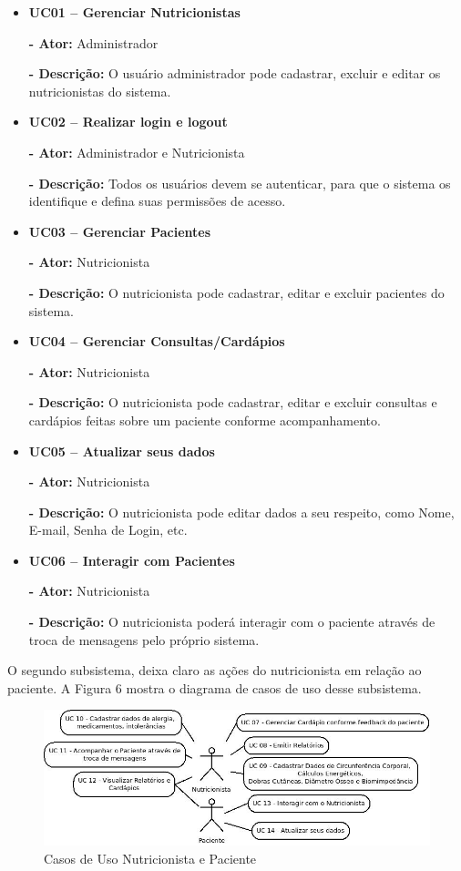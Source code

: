 \documentclass[
	12pt,				%
    oneside,			%
	a4paper,			%
	english,			%
	french,				%
	spanish,			%
	brazil,				%
	]{abntex2}
\begin{document}
\begin{itemize}
\item \textbf{UC01 – Gerenciar Nutricionistas}

\textbf{- Ator:} Administrador

\textbf{- Descrição:} O usuário administrador pode cadastrar, excluir e
editar os nutricionistas do sistema.

\item \textbf{UC02 – Realizar login e logout}

\textbf{- Ator:} Administrador e Nutricionista

\textbf{- Descrição:} Todos os usuários devem se autenticar, para que o
sistema os identifique e defina suas permissões de acesso.

\item \textbf{UC03 – Gerenciar Pacientes}

\textbf{- Ator:} Nutricionista

\textbf{- Descrição:} O nutricionista pode cadastrar, editar e excluir
pacientes do sistema.

\item \textbf{UC04 – Gerenciar Consultas/Cardápios}

\textbf{- Ator:} Nutricionista

\textbf{- Descrição:} O nutricionista pode cadastrar, editar e excluir
consultas e cardápios feitas sobre um paciente conforme acompanhamento.

\item \textbf{UC05 – Atualizar seus dados}

\textbf{- Ator:} Nutricionista

\textbf{- Descrição:} O nutricionista pode editar dados a seu respeito,
como Nome, E-mail, Senha de Login, etc.

\item \textbf{UC06 – Interagir com Pacientes}

\textbf{- Ator:} Nutricionista

\textbf{- Descrição:} O nutricionista poderá interagir com o paciente através de troca de mensagens pelo próprio sistema.

\end{itemize}

O segundo subsistema, deixa claro as ações do nutricionista em relação ao
paciente. A Figura 6 mostra o diagrama de casos de uso desse subsistema.

\begin{figure} [hbt] 
\begin{center}
\includegraphics[width=1\textwidth]{uc2.jpeg}
\end{center}
\label{uc2} 
\caption{Casos de Uso Nutricionista e Paciente}
\end{figure}
\end{document}
